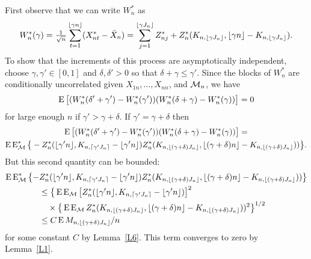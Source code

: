 \documentclass[11pt]{article}
\begin{document}
First observe that we can write $W_n^{*}$ as
\begin{equation*}
  W^{*}_n(\gamma)
  = \tfrac{1}{\sqrt{n}} \sum_{t=1}^{\lfloor \gamma n \rfloor} (X_{nt}^* - \bar X_{n})
  = \sum_{j=1}^{\lfloor \gamma J_n \rfloor} {Z^*_{n{j}}} + Z_n^*({K_{n, {\lfloor \gamma J_n \rfloor}}}, {\lfloor \gamma n \rfloor} - {K_{n, {\lfloor \gamma J_n \rfloor}}}).
\end{equation*}
To show that the increments of this process are asymptotically
independent, choose $\gamma, \gamma' \in [0,1]$ and
$\delta, \delta' > 0$ so that $\delta + \gamma \leq \gamma'$. Since
the blocks of $W_n^{*}$ are conditionally uncorrelated given
$X_{1n},\dots,X_{nn}$, and $\mathcal{M}_n$, we have
\begin{equation*}
  \operatorname{E}\big[ (W_n^{*}(\delta' + \gamma') - W_n^{*}(\gamma'))
  (W_n^{*}(\delta + \gamma) - W_n^{*}(\gamma)) \big] = 0
\end{equation*}
for large enough $n$ if $\gamma' > \gamma + \delta$. If $\gamma' =
\gamma + \delta$ then
\begin{multline*}
  \operatorname{E}\big[(W_n^{*}(\delta' + \gamma') - W_n^{*}(\gamma'))
  (W_n^{*}(\delta + \gamma) - W_n^{*}(\gamma)) \big] = \\
  \operatorname{E} \operatorname{E}_{\mathcal{M}}^*\big\{- Z_n^*(\lfloor \gamma' n \rfloor, K_{n, \lceil \gamma' J_n \rceil }- \lfloor \gamma' n \rfloor)
  Z_n^*(K_{n,\lfloor (\gamma + \delta) J_n \rfloor},
  \lfloor (\gamma + \delta) n \rfloor - K_{n,\lfloor (\gamma + \delta) J_n \rfloor}))\big\}.
\end{multline*}
But this second quantity can be bounded:
\begin{align*}
  \operatorname{E} \operatorname{E}_{\mathcal{M}}^*\big\{-& Z_n^*(\lfloor \gamma' n \rfloor,
  K_{n, \lceil \gamma' J_n \rceil }- \lfloor \gamma' n \rfloor)
  Z_n^*(K_{n,\lfloor (\gamma + \delta) J_n \rfloor},
  \lfloor (\gamma + \delta) n \rfloor - K_{n,\lfloor (\gamma + \delta) J_n \rfloor}))\big\} \\
  &\leq \big\{\operatorname{E} \operatorname{E}_{\mathcal{M}}\big[Z_n^*(\lfloor \gamma' n \rfloor, K_{n, \lceil \gamma' J_n \rceil }- \lfloor \gamma' n \rfloor)\big]^2 \\
  & \quad \times \big\{\operatorname{E} \operatorname{E}_{\mathcal{M}} Z_n^*(K_{n,\lfloor (\gamma + \delta) J_n \rfloor},
  \lfloor (\gamma + \delta) n \rfloor - K_{n,\lfloor (\gamma + \delta) J_n \rfloor}))^2\big\}^{1/2} \\
  &\leq C \operatorname{E} M_{n, \lfloor (\gamma + \delta) J_n \rfloor} / n
\end{align*}
for some constant $C$ by
Lemma~\ref{L6}. This term
converges to zero by Lemma~\ref{L1}.
\end{document}
